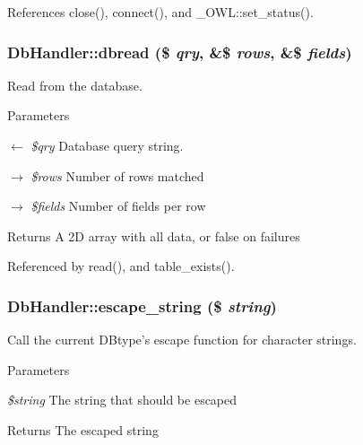 References close(), connect(), and \_\-OWL::set\_\-status().

\subsubsection[{dbread}]{\setlength{\rightskip}{0pt plus 5cm}DbHandler::dbread (\$ {\em qry}, \/  \&\$ {\em rows}, \/  \&\$ {\em fields})}\label{classDbHandler_a130e49aa639fecb46ce6719ddcb0d72f}
Read from the database.


\begin{DoxyParams}{Parameters}
\item[\mbox{$\leftarrow$} {\em \$qry}]Database query string. \item[\mbox{$\rightarrow$} {\em \$rows}]Number of rows matched \item[\mbox{$\rightarrow$} {\em \$fields}]Number of fields per row \end{DoxyParams}
\begin{DoxyReturn}{Returns}
A 2D array with all data, or false on failures 
\end{DoxyReturn}


Referenced by read(), and table\_\-exists().

\subsubsection[{escape\_\-string}]{\setlength{\rightskip}{0pt plus 5cm}DbHandler::escape\_\-string (\$ {\em string})}\label{classDbHandler_a67d77702ff6db70f89123d3f947af143}
Call the current DBtype's escape function for character strings.


\begin{DoxyParams}{Parameters}
\item[{\em \$string}]The string that should be escaped \end{DoxyParams}
\begin{DoxyReturn}{Returns}
The escaped string 
\end{DoxyReturn}

